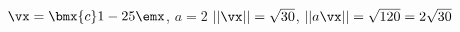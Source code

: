{$\vx = \bmx{c} 1\\-2\\5\emx$, $a = 2$
}
{$||\vx|| = \sqrt{30}$, $||a\vx|| = \sqrt{120} = 2\sqrt{30}$
}